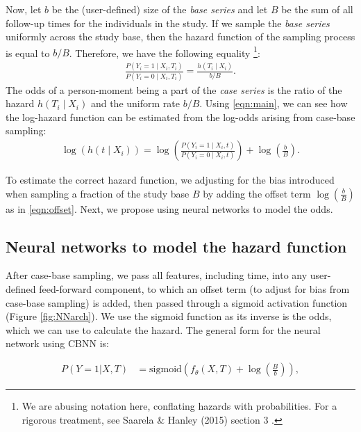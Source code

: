 \documentclass[AMA,STIX1COL,]{WileyNJD-v2}
\begin{document}
Now, let \(b\) be the (user-defined) size of the \emph{base series} and
let \(B\) be the sum of all follow-up times for the individuals in the
study. If we sample the \emph{base series} uniformly across the study
base, then the hazard function of the sampling process is equal to
\(b/B\). Therefore, we have the following equality
\footnote{We are abusing notation here, conflating hazards with probabilities. For a rigorous treatment, see Saarela \& Hanley (2015) section 3 \cite{saarela2015} .}:
\begin{align}\label{eqn:main}
\frac{P\left(Y_i=1 \mid X_i, T_i\right)}{P\left(Y_i = 0 \mid X_i, T_i\right)} = \frac{h\left(T_i \mid X_i\right)}{b/B}.
\end{align} The odds of a person-moment being a part of the \emph{case
series} is the ratio of the hazard \(h(T_i \mid X_i)\) and the uniform
rate \(b/B\). Using \eqref{eqn:main}, we can see how the log-hazard
function can be estimated from the log-odds arising from case-base
sampling: \begin{align}\label{eqn:offset}
\log \left( h\left(t \mid X_i\right)\right) = \log \left(\frac{P\left(Y_i = 1 \mid X_i, t\right)}{P\left(Y_i = 0 \mid X_i, t\right)}\right) + \log\left(\frac{b}{B}\right).
\end{align}

To estimate the correct hazard function, we adjusting for the bias
introduced when sampling a fraction of the study base \(B\) by adding
the offset term \(\log\left(\frac{b}{B} \right)\) as in
\eqref{eqn:offset}. Next, we propose using neural networks to model the
odds.

\hypertarget{neural-networks-to-model-the-hazard-function}{%
\subsection{Neural networks to model the hazard
function}\label{neural-networks-to-model-the-hazard-function}}

After case-base sampling, we pass all features, including time, into any
user-defined feed-forward component, to which an offset term (to adjust
for bias from case-base sampling) is added, then passed through a
sigmoid activation function (Figure \ref{fig:NNarch}). We use the
sigmoid function as its inverse is the odds, which we can use to
calculate the hazard. The general form for the neural network using CBNN
is:

\begin{align}\label{eqn:nnProb}
P\left(Y=1|X,T\right)&=\mathrm{sigmoid}\left(f_{\theta}(X, T) + \log\left(\frac{B}{b}\right) \right),
\end{align}
\end{document}
